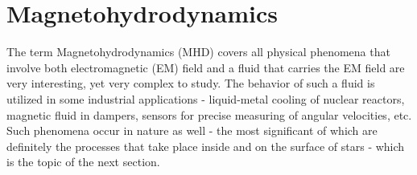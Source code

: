 \section{Magnetohydrodynamics}
The term Magnetohydrodynamics (MHD) covers all physical phenomena that involve both electromagnetic (EM) field and a fluid that carries the EM field are very interesting, yet very complex to study. The behavior of such a fluid is utilized in some industrial applications - liquid-metal cooling of nuclear reactors, magnetic fluid in dampers, sensors for precise measuring of angular velocities, etc. Such phenomena occur in nature as well - the most significant of which are definitely the processes that take place inside and on the surface of stars - which is the topic of the next section.